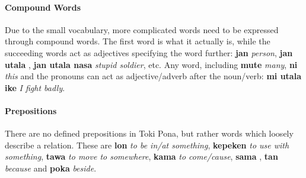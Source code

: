 \documentclass[10pt,a4paper]{article}
\begin{document}
\paragraph{Compound Words}

Due to the small vocabulary, more complicated words need to be expressed through compound words. The first word is what it actually is, while the succeeding words act as adjectives specifying the word further: \textbf{jan} \textit{person}, \textbf{jan utala} , \textbf{jan utala nasa} \textit{stupid soldier}, etc. Any word, including \textbf{mute} \textit{many}, \textbf{ni} \textit{this} and the pronouns can act as adjective/adverb after the noun/verb: \textbf{mi utala ike} \textit{I fight badly}.

\paragraph{Prepositions}

There are no defined prepositions in Toki Pona, but rather words which loosely describe a relation. These are \textbf{lon} \textit{to be in/at something}, \textbf{kepeken} \textit{to use with something}, \textbf{tawa} \textit{to move to somewhere}, \textbf{kama} \textit{to come/cause}, \textbf{sama} , \textbf{tan} \textit{because} and \textbf{poka} \textit{beside}.
\end{document}
